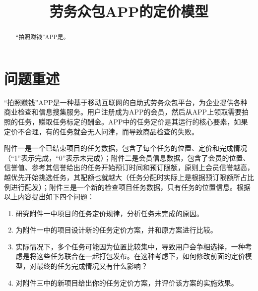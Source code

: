 \documentclass[withoutpreface,bwprint]{cumcmthesis} %
\title{劳务众包APP的定价模型}
\begin{document}
\maketitle
\begin{abstract}
    “拍照赚钱”APP是。

\end{abstract}
\section{问题重述}
“拍照赚钱”APP是一种基于移动互联网的自助式劳务众包平台，为企业提供各种商业检查和信息搜集服务。用户注册成为APP的会员，然后从APP上领取需要拍照的任务，赚取任务标定的酬金。APP中的任务定价是其运行的核心要素，如果定价不合理，有的任务就会无人问津，而导致商品检查的失败。

附件一是一个已结束项目的任务数据，包含了每个任务的位置、定价和完成情况（“1”表示完成，“0”表示未完成）；附件二是会员信息数据，包含了会员的位置、信誉值、参考其信誉给出的任务开始预订时间和预订限额，原则上会员信誉越高，越优先开始挑选任务，其配额也就越大（任务分配时实际上是根据预订限额所占比例进行配发）；附件三是一个新的检查项目任务数据，只有任务的位置信息。根据以上内容提出如下四个问题：

\begin{enumerate}
    \item 研究附件一中项目的任务定价规律，分析任务未完成的原因。
    \item 为附件一中的项目设计新的任务定价方案，并和原方案进行比较。
    \item 实际情况下，多个任务可能因为位置比较集中，导致用户会争相选择，一种考虑是将这些任务联合在一起打包发布。在这种考虑下，如何修改前面的定价模型，对最终的任务完成情况又有什么影响？
    \item 对附件三中的新项目给出你的任务定价方案，并评价该方案的实施效果。
\end{enumerate}
\end{document}
